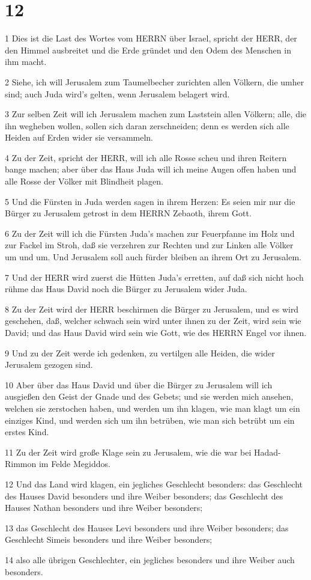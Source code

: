 \chapter{12}

\par 1 Dies ist die Last des Wortes vom HERRN über Israel, spricht der HERR, der den Himmel ausbreitet und die Erde gründet und den Odem des Menschen in ihm macht.
\par 2 Siehe, ich will Jerusalem zum Taumelbecher zurichten allen Völkern, die umher sind; auch Juda wird's gelten, wenn Jerusalem belagert wird.
\par 3 Zur selben Zeit will ich Jerusalem machen zum Laststein allen Völkern; alle, die ihn wegheben wollen, sollen sich daran zerschneiden; denn es werden sich alle Heiden auf Erden wider sie versammeln.
\par 4 Zu der Zeit, spricht der HERR, will ich alle Rosse scheu und ihren Reitern bange machen; aber über das Haus Juda will ich meine Augen offen haben und alle Rosse der Völker mit Blindheit plagen.
\par 5 Und die Fürsten in Juda werden sagen in ihrem Herzen: Es seien mir nur die Bürger zu Jerusalem getrost in dem HERRN Zebaoth, ihrem Gott.
\par 6 Zu der Zeit will ich die Fürsten Juda's machen zur Feuerpfanne im Holz und zur Fackel im Stroh, daß sie verzehren zur Rechten und zur Linken alle Völker um und um. Und Jerusalem soll auch fürder bleiben an ihrem Ort zu Jerusalem.
\par 7 Und der HERR wird zuerst die Hütten Juda's erretten, auf daß sich nicht hoch rühme das Haus David noch die Bürger zu Jerusalem wider Juda.
\par 8 Zu der Zeit wird der HERR beschirmen die Bürger zu Jerusalem, und es wird geschehen, daß, welcher schwach sein wird unter ihnen zu der Zeit, wird sein wie David; und das Haus David wird sein wie Gott, wie des HERRN Engel vor ihnen.
\par 9 Und zu der Zeit werde ich gedenken, zu vertilgen alle Heiden, die wider Jerusalem gezogen sind.
\par 10 Aber über das Haus David und über die Bürger zu Jerusalem will ich ausgießen den Geist der Gnade und des Gebets; und sie werden mich ansehen, welchen sie zerstochen haben, und werden um ihn klagen, wie man klagt um ein einziges Kind, und werden sich um ihn betrüben, wie man sich betrübt um ein erstes Kind.
\par 11 Zu der Zeit wird große Klage sein zu Jerusalem, wie die war bei Hadad-Rimmon im Felde Megiddos.
\par 12 Und das Land wird klagen, ein jegliches Geschlecht besonders: das Geschlecht des Hauses David besonders und ihre Weiber besonders; das Geschlecht des Hauses Nathan besonders und ihre Weiber besonders;
\par 13 das Geschlecht des Hauses Levi besonders und ihre Weiber besonders; das Geschlecht Simeis besonders und ihre Weiber besonders;
\par 14 also alle übrigen Geschlechter, ein jegliches besonders und ihre Weiber auch besonders.

